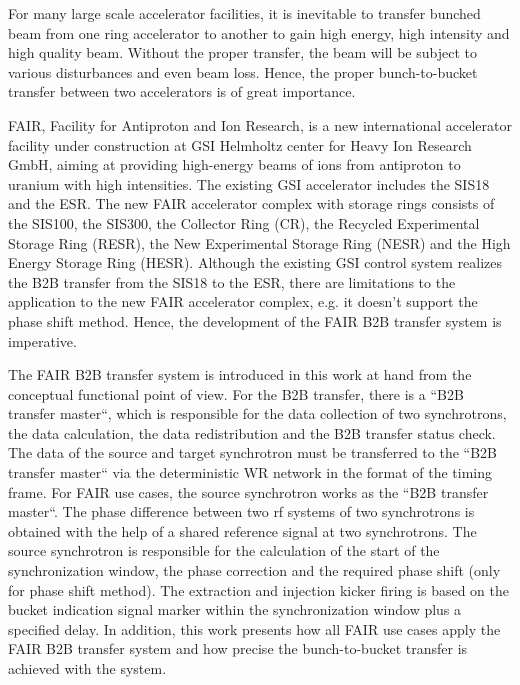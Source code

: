 For many large scale accelerator facilities, it is inevitable to transfer bunched beam from one ring accelerator to another to gain high energy, high intensity and high quality beam. Without the proper transfer, the beam will be subject to various disturbances and even beam loss. Hence, the proper bunch-to-bucket transfer between two accelerators is of great importance. 

FAIR, Facility for Antiproton and Ion Research, is a new international accelerator facility under construction at GSI Helmholtz center for Heavy Ion Research GmbH, aiming at providing high-energy beams of ions from antiproton to uranium with high intensities. The existing GSI accelerator includes the SIS18 and the ESR. The new FAIR accelerator complex with storage rings consists of the SIS100, the SIS300, the Collector Ring (CR), the Recycled Experimental Storage Ring (RESR), the New Experimental Storage Ring (NESR) and the High Energy Storage Ring (HESR). Although the existing GSI control system realizes the B2B transfer from the SIS18 to the
ESR, there are limitations to the application to the new FAIR accelerator complex, e.g. it doesn't support the phase shift method. Hence, the development of the FAIR B2B transfer system is imperative. 

The FAIR B2B transfer system is introduced in this work at hand from the conceptual functional point of view. For the B2B transfer, there is a “B2B transfer master“, which is responsible for the data collection of two synchrotrons, the data calculation, the data redistribution and the B2B transfer status check. The data of the source and target synchrotron must be transferred to the “B2B transfer master“ via the deterministic WR network in the format of the timing frame. For FAIR use cases, the source synchrotron works as the ``B2B transfer master``. The phase difference between two rf systems of two synchrotrons is obtained with the help of a shared reference signal at two synchrotrons. The source synchrotron is responsible for the calculation of the start of the synchronization window, the phase correction and the required phase shift (only for phase shift method). The extraction and injection kicker firing is based on the bucket indication signal marker within the synchronization window plus a specified delay. In addition, this work presents how all FAIR use cases apply the FAIR B2B transfer system and how precise the bunch-to-bucket transfer is achieved with the system. 

